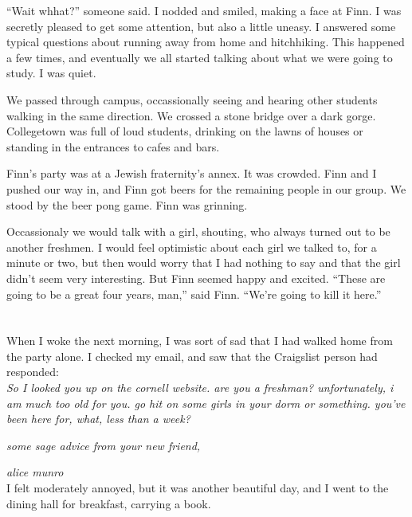 ``Wait whhat?'' someone said.  I nodded and smiled, making a face at Finn.  I
was secretly pleased to get some attention, but also a little uneasy.  I
answered some typical questions about running away from home and hitchhiking.
This happened a few times, and eventually we all started talking about what we
were going to study.  I was quiet. 

We passed through campus, occassionally seeing and hearing other students
walking in the same direction.  We crossed a stone bridge over a dark gorge.
Collegetown was full of loud students, drinking on the lawns of houses or
standing in the entrances to cafes and bars.

Finn's party was at a Jewish fraternity's annex.  It was crowded.  Finn and I
pushed our way in, and Finn got beers for the remaining people in our group.  We
stood by the beer pong game.  Finn was grinning.

Occassionaly we would talk with a girl, shouting, who always turned out to be
another freshmen.  I would feel optimistic about each girl we talked to, for a
minute or two, but then would worry that I had nothing to say and that the girl
didn't seem very interesting.  But Finn seemed happy and excited.  ``These are
going to be a great four years, man,'' said Finn.  ``We're going to kill it
here.''

\section{}

When I woke the next morning, I was sort of sad that I had walked home from the
party alone.  I checked my email, and saw that the Craigslist person had
responded: \\

\textit{
So I looked you up on the cornell website. are you a freshman? unfortunately, i
am much too old for you. go hit on some girls in your dorm or something. you've
been here for, what, less than a week?}

\textit{some sage advice from your new friend,}

\textit{alice munro}\\

I felt moderately annoyed, but it was another beautiful day, and I went to the
dining hall for breakfast, carrying a book.  

\section{}

